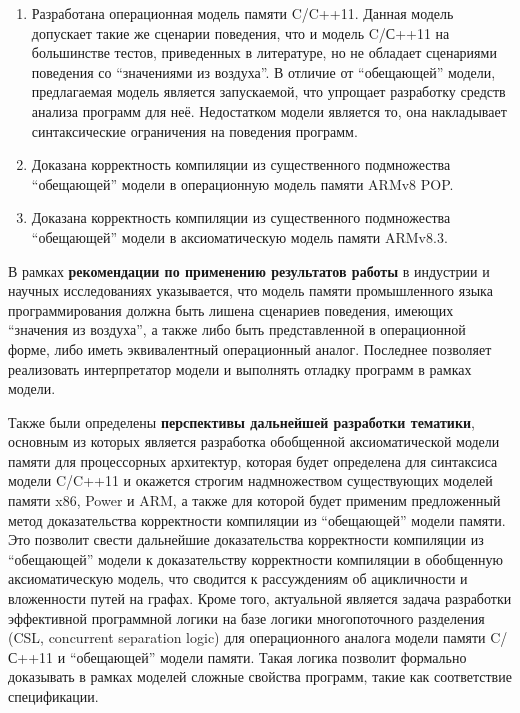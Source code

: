 \begin{enumerate}
  \item Разработана операционная модель памяти C/C++11.
    Данная модель допускает такие же сценарии поведения, что и модель C/С++11 на большинстве
    тестов, приведенных в литературе, но не обладает сценариями поведения со ``значениями из воздуха''.
    В отличие от ``обещающей'' модели, предлагаемая модель является запускаемой, что упрощает
    разработку средств анализа программ для неё. Недостатком модели является то,
    она накладывает синтаксические ограничения на поведения программ.
  \item Доказана корректность компиляции из существенного подмножества ``обещающей'' модели в операционную модель
    памяти ARMv8 POP.
  \item Доказана корректность компиляции из существенного подмножества ``обещающей'' модели в
    аксиоматическую модель памяти ARMv8.3.
\end{enumerate}

В рамках \textbf{рекомендации по применению результатов работы} в индустрии и научных исследованиях указывается,
что модель памяти промышленного языка программирования должна быть лишена сценариев поведения, имеющих ``значения из воздуха'',
а также либо быть представленной в операционной форме, либо иметь эквивалентный операционный аналог.
Последнее позволяет реализовать интерпретатор модели и выполнять отладку программ в рамках модели.

Также были определены \textbf{перспективы дальнейшей разработки тематики}, основным из которых является
разработка обобщенной аксиоматической модели памяти для процессорных архитектур, которая будет
определена для синтаксиса модели C/C++11 и окажется строгим надмножеством существующих моделей памяти
x86, Power и ARM, а также для которой будет применим предложенный метод доказательства корректности компиляции
из ``обещающей'' модели памяти. Это позволит свести дальнейшие доказательства корректности компиляции из
``обещающей'' модели к доказательству корректности компиляции в обобщенную аксиоматическую модель, что
сводится к рассуждениям об ацикличности и вложенности путей на графах.
Кроме того, актуальной является задача разработки эффективной программной логики на базе логики многопоточного разделения
(CSL, concurrent separation logic) для операционного аналога модели памяти C/С++11 и ``обещающей'' модели памяти.
Такая логика позволит формально доказывать  в рамках моделей сложные свойства программ, такие как соответствие спецификации.
